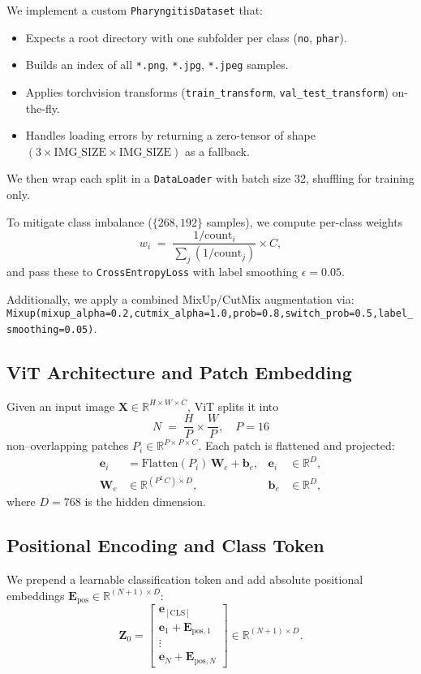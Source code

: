We implement a custom \texttt{PharyngitisDataset} that:
\begin{itemize}
  \item Expects a root directory with one subfolder per class (\texttt{no}, \texttt{phar}).
  \item Builds an index of all \texttt{*.png}, \texttt{*.jpg}, \texttt{*.jpeg} samples.
  \item Applies torchvision transforms (\texttt{train\_transform}, \texttt{val\_test\_transform}) on-the-fly.
  \item Handles loading errors by returning a zero-tensor of shape $(3\times \text{IMG\_SIZE}\times \text{IMG\_SIZE})$ as a fallback.
\end{itemize}

We then wrap each split in a \texttt{DataLoader} with batch size 32, shuffling for training only.

To mitigate class imbalance (\(\{268,192\}\) samples), we compute per-class weights
\[
  w_i \;=\; \frac{1/\mathrm{count}_i}{\sum_j (1/\mathrm{count}_j)} \times C,
\]
and pass these to \texttt{CrossEntropyLoss} with label smoothing \(\epsilon=0.05\).

Additionally, we apply a combined MixUp/CutMix augmentation via:\newline
\texttt{Mixup(mixup\_alpha=0.2,cutmix\_alpha=1.0,prob=0.8,switch\_prob=0.5,label\_smoothing=0.05)}.

\subsection{ViT Architecture and Patch Embedding}
Given an input image \(\mathbf{X}\in\mathbb{R}^{H\times W\times C}\), ViT splits it into
\[
  N \;=\;\frac{H}{P}\times\frac{W}{P},
  \quad P=16
\]
non–overlapping patches \(P_i\in\mathbb{R}^{P\times P\times C}\). Each patch is flattened and projected:
\[
  \begin{aligned}
    \mathbf{e}_i &= \mathrm{Flatten}(P_i)\,\mathbf{W}_e + \mathbf{b}_e, 
      &\mathbf{e}_i &\in \mathbb{R}^D,\\
    \mathbf{W}_e &\in \mathbb{R}^{(P^2\,C)\times D}, 
      &\mathbf{b}_e &\in \mathbb{R}^D,
  \end{aligned}
\]
where \(D=768\) is the hidden dimension.

\subsection{Positional Encoding and Class Token}
We prepend a learnable classification token and add absolute positional embeddings \(\mathbf{E}_{\mathrm{pos}}\in\mathbb{R}^{(N+1)\times D}\):
\[
  \mathbf{Z}_0
  = 
  \begin{bmatrix}
    \mathbf{e}_{\mathrm{[CLS]}} \\[6pt]
    \mathbf{e}_1 + \mathbf{E}_{\mathrm{pos},1} \\[3pt]
    \vdots \\[3pt]
    \mathbf{e}_N + \mathbf{E}_{\mathrm{pos},N}
  \end{bmatrix}
  \in \mathbb{R}^{(N+1)\times D}.
\]

